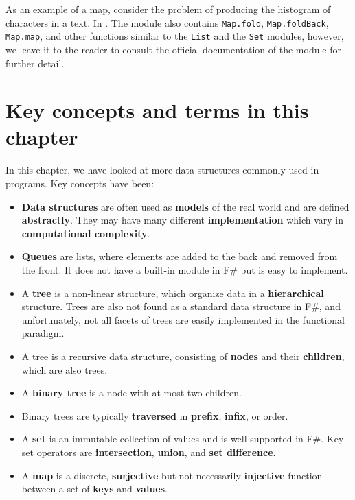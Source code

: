 \documentclass[fsharpNotes.tex]{subfiles}
\begin{document}
As an example of a map, consider the problem of producing the histogram of characters in a text. In .
%
%
The module also contains \lstinline{Map.fold}, \lstinline{Map.foldBack}, \lstinline{Map.map}, and other functions similar to the \lstinline{List} and the \lstinline{Set} modules, however, we leave it to the reader to consult the official documentation of the module for further detail.

\section{Key concepts and terms in this chapter}
In this chapter, we have looked at more data structures commonly used in programs. Key concepts have been:
\begin{itemize}
\item \textbf{Data structures} are often used as \textbf{models} of the real world and are defined \textbf{abstractly}. They may have many different \textbf{implementation} which vary in \textbf{computational complexity}. 
\item \textbf{Queues} are lists, where elements are added to the back and removed from the front. It does not have a built-in module in F\# but is easy to implement.
\item A \textbf{tree} is a non-linear structure, which organize data in a \textbf{hierarchical} structure. Trees are also not found as a standard data structure in F\#, and unfortunately, not all facets of trees are easily implemented in the functional paradigm.
\item A tree is a recursive data structure, consisting of \textbf{nodes} and their \textbf{children}, which are also trees. 
\item A \textbf{binary tree} is a node with at most two children.
\item Binary trees are typically \textbf{traversed} in \textbf{prefix}, \textbf{infix}, or  order.
\item A \textbf{set} is an immutable collection of values and is well-supported in F\#. Key set operators are \textbf{intersection}, \textbf{union}, and \textbf{set difference}.
\item A \textbf{map} is a discrete, \textbf{surjective} but not necessarily \textbf{injective} function between a set of \textbf{keys} and \textbf{values}.
\end{itemize}
\end{document}

